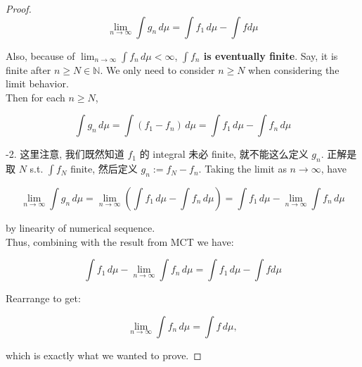 \documentclass{qlnotes-export}
\begin{document}
\begin{proof}
\[\lim\limits_{n\rightarrow\infty}\int g_{n}\, d\mu = \int f_{1}\, d\mu - \int f d\mu\]

Also, because of \(\lim_{n\rightarrow\infty}\int f_{n}\, d\mu < \infty\), \textbf{\(\int f_{n}\) is eventually finite}. Say, it is finite after \(n \geq N \in {\mathbb{N}}\). We only need to consider \(n \geq N\) when considering the limit behavior.\\
Then for each \(n \geq N\),

\[\int g_{n}\, d\mu = \int(f_{1} - f_{n})\, d\mu = \int f_{1}\, d\mu - \int f_{n}\, d\mu\]

-2. 这里注意, 我们既然知道 \(f_{1}\) 的 integral 未必 finite, 就不能这么定义 \(g_{n}\). 正解是取 \(N\) s.t. \(\int f_{N}\) finite, 然后定义 \(g_{n} := f_{N} - f_{n}\). Taking the limit as \(n\rightarrow\infty\), have

\[\lim\limits_{n\rightarrow\infty}\int g_{n}\, d\mu = \lim\limits_{n\rightarrow\infty}\left( {\int f_{1}\, d\mu - \int f_{n}\, d\mu} \right) = \int f_{1}\, d\mu - \lim\limits_{n\rightarrow\infty}\int f_{n}\, d\mu\]

by linearity of numerical sequence.\\
Thus, combining with the result from MCT we have:

\[\int f_{1}\, d\mu - \lim\limits_{n\rightarrow\infty}\int f_{n}\, d\mu = \int f_{1}\, d\mu - \int f d\mu\]

Rearrange to get:

\[\lim\limits_{n\rightarrow\infty}\int f_{n}\, d\mu = \int f\, d\mu,\]

which is exactly what we wanted to prove.

\end{proof}
\end{document}
